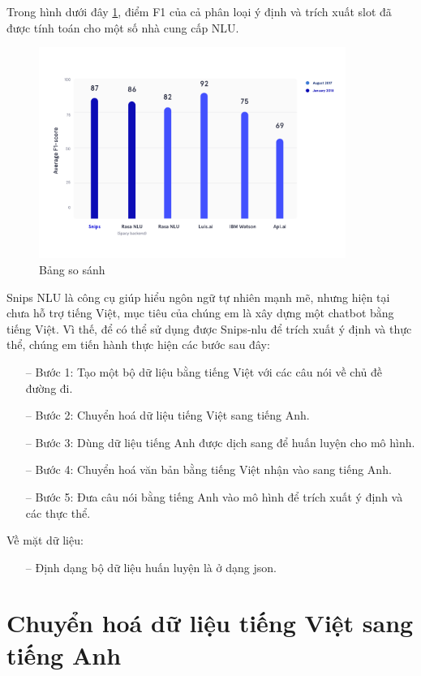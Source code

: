 Trong hình dưới đây \ref{fig:benchmarks}, điểm F1 của cả phân loại ý định và trích xuất slot đã được tính toán cho một số nhà cung cấp NLU.

\begin{figure}[htp]
    \centering
    \includegraphics[width=10cm]{images/benchmarks.png}
    \caption{Bảng so sánh}
    \label{fig:benchmarks}
\end{figure}

Snips NLU là công cụ giúp hiểu ngôn ngữ tự nhiên mạnh mẽ, nhưng hiện tại chưa hỗ trợ tiếng Việt, mục tiêu của chúng em là xây dựng một chatbot bằng tiếng Việt. Vì thế, để có thể sử dụng được Snips-nlu để trích xuất ý định và thực thể, chúng em tiến hành thực hiện các bước sau đây:
\begin{itemize}
    \item[--] Bước 1: Tạo một bộ dữ liệu bằng tiếng Việt với các câu nói về chủ đề đường đi.
    \item[--] Bước 2: Chuyển hoá dữ liệu tiếng Việt sang tiếng Anh.
    \item[--] Bước 3: Dùng dữ liệu tiếng Anh được dịch sang để huấn luyện cho mô hình.
    \item[--] Bước 4: Chuyển hoá văn bản bằng tiếng Việt nhận vào sang tiếng Anh.
    \item[--] Bước 5: Đưa câu nói bằng tiếng Anh vào mô hình để trích xuất ý định và các thực thể.
\end{itemize}

Về mặt dữ liệu:
\begin{itemize}
    \item[--] Định dạng bộ dữ liệu huấn luyện là ở dạng json.
\end{itemize}

\section{Chuyển hoá dữ liệu tiếng Việt sang tiếng Anh}
